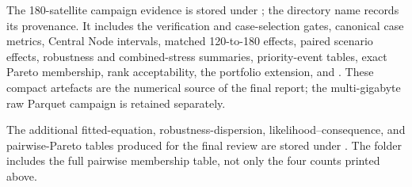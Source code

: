 The 180-satellite campaign evidence is stored under ; the directory name records its provenance. It includes the verification and case-selection gates, canonical case metrics, Central Node intervals, matched 120-to-180 effects, paired scenario effects, robustness and combined-stress summaries, priority-event tables, exact Pareto membership, rank acceptability, the portfolio extension, and . These compact artefacts are the numerical source of the final report; the multi-gigabyte raw Parquet campaign is retained separately.

The additional fitted-equation, robustness-dispersion, likelihood--consequence, and pairwise-Pareto tables produced for the final review are stored under . The folder includes the full pairwise membership table, not only the four counts printed above.

